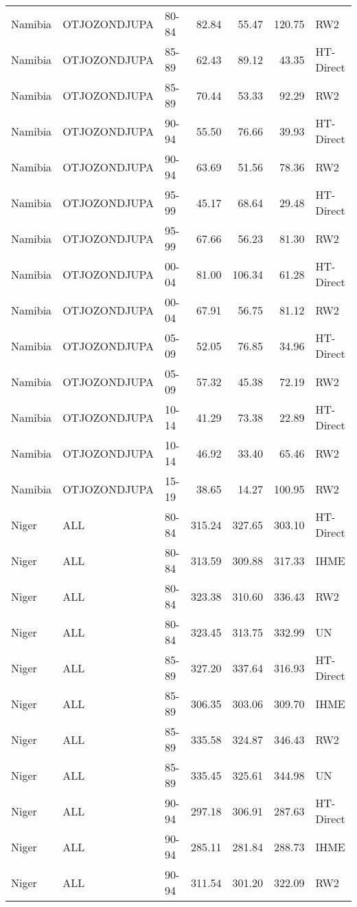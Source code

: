 \begin{longtable}{lllrrrl}
  Namibia & OTJOZONDJUPA & 80-84 & 82.84 & 55.47 & 120.75 & RW2 \\ 
  Namibia & OTJOZONDJUPA & 85-89 & 62.43 & 89.12 & 43.35 & HT-Direct \\ 
  Namibia & OTJOZONDJUPA & 85-89 & 70.44 & 53.33 & 92.29 & RW2 \\ 
  Namibia & OTJOZONDJUPA & 90-94 & 55.50 & 76.66 & 39.93 & HT-Direct \\ 
  Namibia & OTJOZONDJUPA & 90-94 & 63.69 & 51.56 & 78.36 & RW2 \\ 
  Namibia & OTJOZONDJUPA & 95-99 & 45.17 & 68.64 & 29.48 & HT-Direct \\ 
  Namibia & OTJOZONDJUPA & 95-99 & 67.66 & 56.23 & 81.30 & RW2 \\ 
  Namibia & OTJOZONDJUPA & 00-04 & 81.00 & 106.34 & 61.28 & HT-Direct \\ 
  Namibia & OTJOZONDJUPA & 00-04 & 67.91 & 56.75 & 81.12 & RW2 \\ 
  Namibia & OTJOZONDJUPA & 05-09 & 52.05 & 76.85 & 34.96 & HT-Direct \\ 
  Namibia & OTJOZONDJUPA & 05-09 & 57.32 & 45.38 & 72.19 & RW2 \\ 
  Namibia & OTJOZONDJUPA & 10-14 & 41.29 & 73.38 & 22.89 & HT-Direct \\ 
  Namibia & OTJOZONDJUPA & 10-14 & 46.92 & 33.40 & 65.46 & RW2 \\ 
  Namibia & OTJOZONDJUPA & 15-19 & 38.65 & 14.27 & 100.95 & RW2 \\ 
  Niger & ALL & 80-84 & 315.24 & 327.65 & 303.10 & HT-Direct \\ 
  Niger & ALL & 80-84 & 313.59 & 309.88 & 317.33 & IHME \\ 
  Niger & ALL & 80-84 & 323.38 & 310.60 & 336.43 & RW2 \\ 
  Niger & ALL & 80-84 & 323.45 & 313.75 & 332.99 & UN \\ 
  Niger & ALL & 85-89 & 327.20 & 337.64 & 316.93 & HT-Direct \\ 
  Niger & ALL & 85-89 & 306.35 & 303.06 & 309.70 & IHME \\ 
  Niger & ALL & 85-89 & 335.58 & 324.87 & 346.43 & RW2 \\ 
  Niger & ALL & 85-89 & 335.45 & 325.61 & 344.98 & UN \\ 
  Niger & ALL & 90-94 & 297.18 & 306.91 & 287.63 & HT-Direct \\ 
  Niger & ALL & 90-94 & 285.11 & 281.84 & 288.73 & IHME \\ 
  Niger & ALL & 90-94 & 311.54 & 301.20 & 322.09 & RW2 \\ 

\end{longtable}
